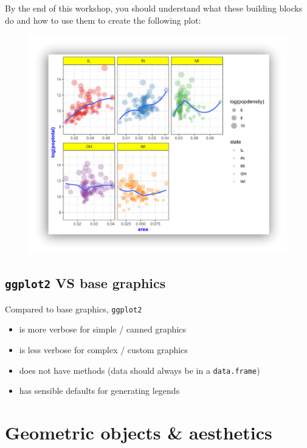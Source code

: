 \documentclass[]{book}
\providecommand{\tightlist}{%
  \setlength{\itemsep}{0pt}\setlength{\parskip}{0pt}}
\begin{document}
By the end of this workshop, you should understand what these building
blocks do and how to use them to create the following plot:

\begin{figure}
\centering
\includegraphics{R/Rgraphics/images/final_plot.png}
\caption{}
\end{figure}

\subsection{\texorpdfstring{\texttt{ggplot2} VS base
graphics}{ggplot2 VS base graphics}}\label{ggplot2-vs-base-graphics}

Compared to base graphics, \texttt{ggplot2}

\begin{itemize}
\tightlist
\item
  is more verbose for simple / canned graphics
\item
  is less verbose for complex / custom graphics
\item
  does not have methods (data should always be in a \texttt{data.frame})
\item
  has sensible defaults for generating legends
\end{itemize}

\section{Geometric objects \&
aesthetics}\label{geometric-objects-aesthetics}
\end{document}

